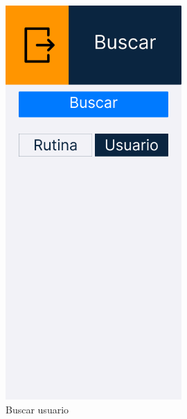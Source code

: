 \begin{figure}[H]
   \centering
    \includegraphics[width=0.6\textwidth]{fotos/Frame 53.png}
    \caption{Buscar usuario}
    \label{fig:Buscar usuario}
\end{figure}
